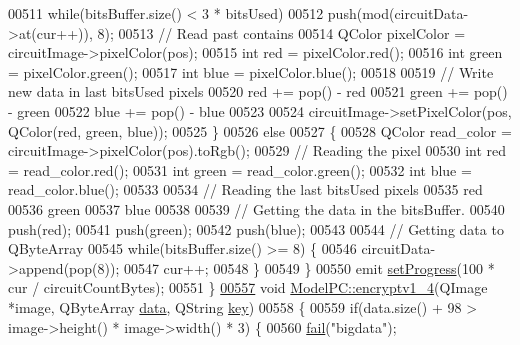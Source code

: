 \begin{DoxyCode}
00511         \textcolor{keywordflow}{while}(bitsBuffer.size() < 3 * bitsUsed)
00512             push(mod(circuitData->at(cur++)), 8);
00513         \textcolor{comment}{// Read past contains}
00514         QColor pixelColor = circuitImage->pixelColor(pos);
00515         \textcolor{keywordtype}{int} red = pixelColor.red();
00516         \textcolor{keywordtype}{int} green = pixelColor.green();
00517         \textcolor{keywordtype}{int} blue = pixelColor.blue();
00518 
00519         \textcolor{comment}{// Write new data in last bitsUsed pixels}
00520         red += pop() - red %
00521         green += pop() - green %
00522         blue += pop() - blue %
00523 
00524         circuitImage->setPixelColor(pos, QColor(red, green, blue));
00525     \}
00526     \textcolor{keywordflow}{else}
00527     \{
00528         QColor read\_color = circuitImage->pixelColor(pos).toRgb();
00529         \textcolor{comment}{// Reading the pixel}
00530         \textcolor{keywordtype}{int} red = read\_color.red();
00531         \textcolor{keywordtype}{int} green = read\_color.green();
00532         \textcolor{keywordtype}{int} blue = read\_color.blue();
00533 
00534         \textcolor{comment}{// Reading the last bitsUsed pixels}
00535         red %
00536         green %
00537         blue %
00538 
00539         \textcolor{comment}{// Getting the data in the bitsBuffer.}
00540         push(red);
00541         push(green);
00542         push(blue);
00543 
00544         \textcolor{comment}{// Getting data to QByteArray}
00545         \textcolor{keywordflow}{while}(bitsBuffer.size() >= 8) \{
00546             circuitData->append(pop(8));
00547             cur++;
00548         \}
00549     \}
00550     emit \hyperlink{class_model_p_c_afdcd80f0ed5062e145a71f09b0897547}{setProgress}(100 * cur / circuitCountBytes);
00551 \}
\hypertarget{modelpc_8cpp_source.tex_l00557}{}\hyperlink{class_model_p_c_a4daefc3fb87a1f19172b9b20c987eb12}{00557} \textcolor{keywordtype}{void} \hyperlink{class_model_p_c_a4daefc3fb87a1f19172b9b20c987eb12}{ModelPC::encryptv1\_4}(QImage *image, QByteArray \hyperlink{namespace_errors_dict_setup_af570460846fb9f0c91abd308a095dcdc}{data}, QString 
      \hyperlink{namespace_errors_dict_setup_a09c268098d09ffb8e5504f30fa6d5dd9}{key})
00558 \{
00559     \textcolor{keywordflow}{if}(data.size() + 98 > image->height() * image->width() * 3) \{
00560         \hyperlink{class_model_p_c_a47464b59b7e37fcee25e55475708aabd}{fail}(\textcolor{stringliteral}{"bigdata"});

\end{DoxyCode}
